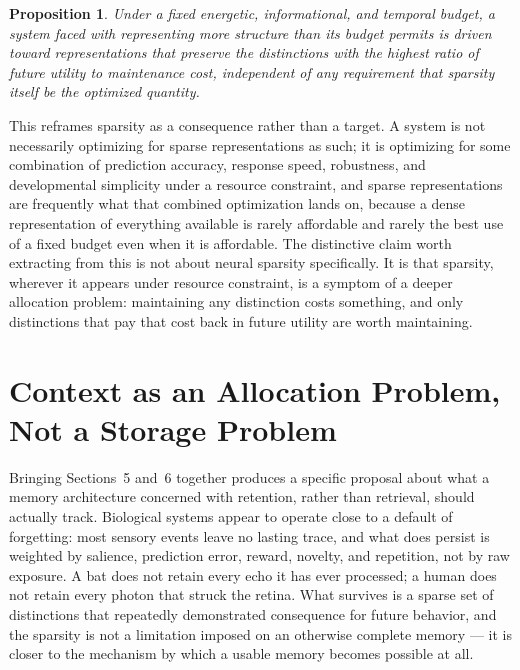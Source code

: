 \documentclass[11pt]{amsart}
\theoremstyle{plain}
\newtheorem{proposition}[theorem]{Proposition}
\theoremstyle{definition}
\theoremstyle{remark}
\begin{document}
\begin{proposition}
\label{prop:sparse-tradeoff}
Under a fixed energetic, informational, and temporal budget, a system
faced with representing more structure than its budget permits is
driven toward representations that preserve the distinctions with the
highest ratio of future utility to maintenance cost, independent of any
requirement that sparsity itself be the optimized quantity.
\end{proposition}

This reframes sparsity as a consequence rather than a target. A system
is not necessarily optimizing for sparse representations as such; it is
optimizing for some combination of prediction accuracy, response speed,
robustness, and developmental simplicity under a resource constraint,
and sparse representations are frequently what that combined
optimization lands on, because a dense representation of everything
available is rarely affordable and rarely the best use of a fixed
budget even when it is affordable. The distinctive claim worth
extracting from this is not about neural sparsity specifically. It is
that sparsity, wherever it appears under resource constraint, is a
symptom of a deeper allocation problem: maintaining any distinction
costs something, and only distinctions that pay that cost back in
future utility are worth maintaining.

\section{Context as an Allocation Problem, Not a Storage Problem}

Bringing Sections~5 and~6 together produces a specific proposal about
what a memory architecture concerned with retention, rather than
retrieval, should actually track. Biological systems appear to operate
close to a default of forgetting: most sensory events leave no lasting
trace, and what does persist is weighted by salience, prediction error,
reward, novelty, and repetition, not by raw exposure. A bat does not
retain every echo it has ever processed; a human does not retain every
photon that struck the retina. What survives is a sparse set of
distinctions that repeatedly demonstrated consequence for future
behavior, and the sparsity is not a limitation imposed on an otherwise
complete memory --- it is closer to the mechanism by which a usable
memory becomes possible at all.
\end{document}

